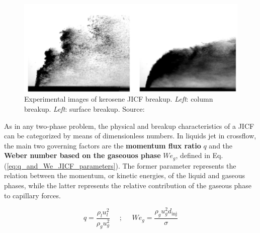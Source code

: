 \begin{figure}[h!]
	\centering
	\includegraphics[scale=0.65]{./part0_intro/JICF_breakup-mechanisms_freitag}
	\caption[Experimental images of kerosene JICF breakup]{Experimental images of kerosene JICF breakup. \textsl{Left}: column breakup. \textsl{Left}: surface breakup. Source: }
	\label{fig:JICF_breakup_mechanisms_freitag}
\end{figure}

As in any two-phase problem, the physical and breakup characteristics of a JICF can be categorized by means of dimensionless numbers. In liquids jet in crossflow, the main two governing factors are the \textbf{momentum flux ratio} $q$ and the \textbf{Weber number based on the gaseouos phase} $We_g$, defined in Eq. (\ref{eq:q_and_We_JICF_parameters}). The former parameter represents the relation between the momentum, or kinetic energies, of the liquid and gaseous phases, while the latter represents the relative contribution of the gaseous phase to capillary forces. 

\begin{equation}
\label{eq:q_and_We_JICF_parameters}
	q = \frac{\rho_l u_l^2}{\rho_g u_g^2} ~~~~~~ ;  ~~~~~~ We_g = \frac{\rho_g u_g^2 d_\mathrm{inj}}{\sigma}
\end{equation}

